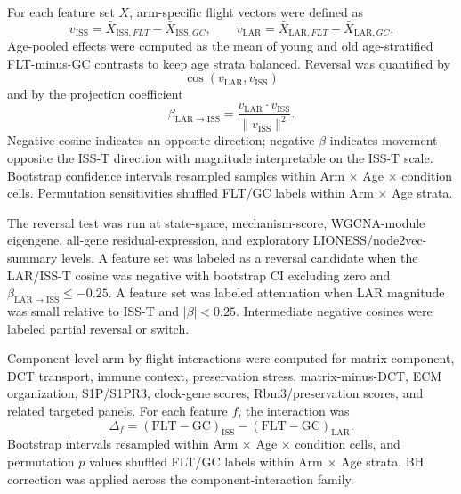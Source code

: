 \documentclass[11pt]{article}
\begin{document}
For each feature set $X$, arm-specific flight vectors were defined as
\begin{equation}
v_{\mathrm{ISS}}=\bar{X}_{\mathrm{ISS},FLT}-\bar{X}_{\mathrm{ISS},GC},
\qquad
v_{\mathrm{LAR}}=\bar{X}_{\mathrm{LAR},FLT}-\bar{X}_{\mathrm{LAR},GC}.
\end{equation}
Age-pooled effects were computed as the mean of young and old age-stratified FLT-minus-GC contrasts to keep age strata balanced. Reversal was quantified by
\begin{equation}
\cos(v_{\mathrm{LAR}},v_{\mathrm{ISS}})
\end{equation}
and by the projection coefficient
\begin{equation}
\beta_{\mathrm{LAR}\rightarrow \mathrm{ISS}}
=\frac{v_{\mathrm{LAR}}\cdot v_{\mathrm{ISS}}}{\lVert v_{\mathrm{ISS}}\rVert^2}.
\end{equation}
Negative cosine indicates an opposite direction; negative $\beta$ indicates movement opposite the ISS-T direction with magnitude interpretable on the ISS-T scale. Bootstrap confidence intervals resampled samples within Arm $\times$ Age $\times$ condition cells. Permutation sensitivities shuffled FLT/GC labels within Arm $\times$ Age strata.

The reversal test was run at state-space, mechanism-score, WGCNA-module eigengene, all-gene residual-expression, and exploratory LIONESS/node2vec-summary levels. A feature set was labeled as a reversal candidate when the LAR/ISS-T cosine was negative with bootstrap CI excluding zero and $\beta_{\mathrm{LAR}\rightarrow \mathrm{ISS}}\leq -0.25$. A feature set was labeled attenuation when LAR magnitude was small relative to ISS-T and $|\beta|<0.25$. Intermediate negative cosines were labeled partial reversal or switch.

Component-level arm-by-flight interactions were computed for matrix component, DCT transport, immune context, preservation stress, matrix-minus-DCT, ECM organization, S1P/S1PR3, clock-gene scores, Rbm3/preservation scores, and related targeted panels. For each feature $f$, the interaction was
\begin{equation}
\Delta_f=(\mathrm{FLT}-\mathrm{GC})_{\mathrm{ISS}}-(\mathrm{FLT}-\mathrm{GC})_{\mathrm{LAR}}.
\end{equation}
Bootstrap intervals resampled within Arm $\times$ Age $\times$ condition cells, and permutation $p$ values shuffled FLT/GC labels within Arm $\times$ Age strata. BH correction was applied across the component-interaction family.
\end{document}
